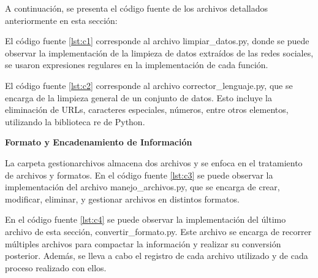 A continuación, se presenta el código fuente de los archivos detallados anteriormente en esta sección:



El código fuente \ref{lst:c1} corresponde al archivo limpiar\_datos.py, donde se puede observar la implementación de la limpieza de datos extraídos de las redes sociales, se usaron expresiones regulares en la implementación de cada función. 





El código fuente \ref{lst:c2} corresponde al archivo corrector\_lenguaje.py, que se encarga de la limpieza general de un conjunto de datos. Esto incluye la eliminación de URLs, caracteres especiales, números, entre otros elementos, utilizando la biblioteca re de Python.



\textbf{Formato y Encadenamiento de Información}

La carpeta gestionarchivos almacena dos archivos y se enfoca en el tratamiento de archivos y formatos. En el código fuente \ref{lst:c3} se puede observar la implementación del archivo manejo\_archivos.py, que se encarga de crear, modificar, eliminar, y gestionar archivos en distintos formatos.



En el código fuente \ref{lst:c4} se puede observar la implementación del último archivo de esta sección, convertir\_formato.py. Este archivo se encarga de recorrer múltiples archivos para compactar la información y realizar su conversión posterior. Además, se lleva a cabo el registro de cada archivo utilizado y de cada proceso realizado con ellos.


